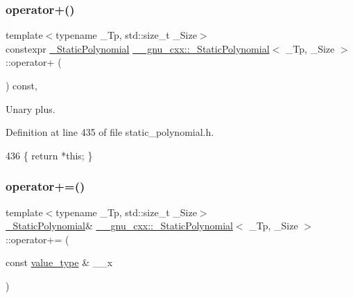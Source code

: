 \subsubsection{\texorpdfstring{operator+()}{operator+()}}
{\footnotesize\ttfamily template$<$typename \+\_\+\+Tp, std\+::size\+\_\+t \+\_\+\+Size$>$ \\
constexpr \hyperlink{class____gnu__cxx_1_1__StaticPolynomial}{\+\_\+\+Static\+Polynomial} \hyperlink{class____gnu__cxx_1_1__StaticPolynomial}{\+\_\+\+\_\+gnu\+\_\+cxx\+::\+\_\+\+Static\+Polynomial}$<$ \+\_\+\+Tp, \+\_\+\+Size $>$\+::operator+ (\begin{DoxyParamCaption}{ }\end{DoxyParamCaption}) const\hspace{0.3cm}{\ttfamily [inline]}, {\ttfamily [noexcept]}}

Unary plus. 

Definition at line 435 of file static\+\_\+polynomial.\+h.


\begin{DoxyCode}
436       \{ \textcolor{keywordflow}{return} *\textcolor{keyword}{this}; \}
\end{DoxyCode}
\mbox{\label{class____gnu__cxx_1_1__StaticPolynomial_a5ff7f8de0762113bd83f264bf7cb0c0b}} 
\subsubsection{\texorpdfstring{operator+=()}{operator+=()}}
{\footnotesize\ttfamily template$<$typename \+\_\+\+Tp, std\+::size\+\_\+t \+\_\+\+Size$>$ \\
\hyperlink{class____gnu__cxx_1_1__StaticPolynomial}{\+\_\+\+Static\+Polynomial}\& \hyperlink{class____gnu__cxx_1_1__StaticPolynomial}{\+\_\+\+\_\+gnu\+\_\+cxx\+::\+\_\+\+Static\+Polynomial}$<$ \+\_\+\+Tp, \+\_\+\+Size $>$\+::operator+= (\begin{DoxyParamCaption}\item[{const \hyperlink{class____gnu__cxx_1_1__StaticPolynomial_aad5f3d6d5876b6926b30724aeac649d6}{value\+\_\+type} \&}]{\+\_\+\+\_\+x }\end{DoxyParamCaption})\hspace{0.3cm}{\ttfamily [inline]}}

